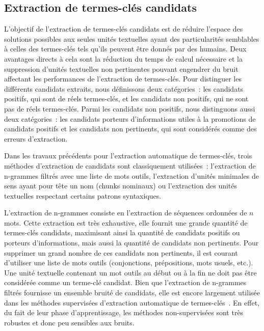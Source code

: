   \subsection{Extraction de termes-clés candidats}
  \label{subsec:extraction_de_termes_cles_candidats}
    L'objectif de l'extraction de termes-clés candidats est de réduire l'espace
    des solutions possibles aux seules unités textuelles ayant des
    particularités semblables à celles des termes-clés tels qu'ils peuvent être
    donnés par des humains. Deux avantages directs à cela sont la réduction du
    temps de calcul nécessaire et la suppression d'unités textuelles non
    pertinentes pouvant engendrer du bruit affectant les performances de
    l'extraction de termes-clés. Pour distinguer les différents candidats
    extraits, nous définissons deux catégories~: les candidats positifs, qui
    sont de réels termes-clés, et les candidats non positifs, qui ne sont pas de
    réels termes-clés. Parmi les candidats non positifs, nous distinguons aussi
    deux catégories~: les candidats porteurs d'informations utiles à la
    promotions de candidats positifs et les candidats non pertinents, qui sont
    considérés comme des erreurs d'extraction.

    Dans les travaux précédents pour l'extraction automatique de termes-clés,
    trois méthodes d'extraction de candidats sont classiquement utilisées~:
    l'extraction de n-grammes filtrés avec une liste de mots outils,
    l'extraction d'unités minimales de sens ayant pour tête un nom (chunks
    nominaux) ou l'extraction des unités textuelles respectant certains patrons
    syntaxiques.

    L'extraction de n-grammes consiste en l'extraction de séquences ordonnées
    de $n$ mots. Cette extraction est très exhaustive, elle fournit une grande
    quantité de termes-clés candidats, maximisant ainsi la quantité de
    candidats positifs ou porteurs d'informations, mais aussi la quantité de
    candidats non pertinents. Pour supprimer un grand nombre de ces candidats
    non pertinents, il est courant d'utiliser une liste de mots outils
    (conjonctions, prépositions, mots usuels, etc.). Une unité textuelle
    contenant un mot outils au début ou à la fin ne doit pas être considérée
    comme un terme-clé candidat. Bien que l'extraction de n-grammes filtrés
    fournisse un ensemble bruité de candidats, elle est encore largement
    utilisée dans les méthodes supervisées d'extraction automatique de
    termes-clés~\cite{witten1999kea,turney1999learningalgorithms,hulth2003keywordextraction}.
    En effet, du fait de leur phase d'apprentissage, les méthodes
    non-supervisées sont très robustes et donc peu sensibles aux bruits.

